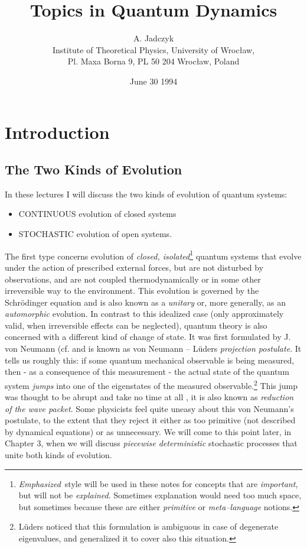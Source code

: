 \documentclass[12pt]{article}
\title{Topics in Quantum Dynamics}
\author{A.  Jadczyk \\
Institute of Theoretical Physics, 
 University of Wroc{\l }aw,  \\
Pl.  Maxa Borna 9,  PL 50 204 Wroc{\l }aw,  Poland} %
\date{June 30 1994}
\begin{document}
\newtheorem{theorem}{Theorem}
\maketitle
\section{Introduction}
\subsection{The Two Kinds of Evolution}
In these lectures I will discuss the two kinds of evolution of
quantum systems:  \begin{itemize}
\item CONTINUOUS evolution of closed systems
\item STOCHASTIC evolution of open systems.  
\end{itemize}
The first type
concerns evolution of {\em closed, 
isolated}\footnote{
{\em Emphasized}\,  style will be  used in these notes
for  concepts that are {\em
important},  but will not be {\em explained}.  Sometimes explanation
would need too much space,  but sometimes because these are either {\em
primitive} or {\em meta--language} notions. } quantum systems that evolve
under the action of prescribed external forces,  but are not disturbed by
observations,  and are not coupled thermodynamically or in some other
irreversible way to the environment.  This evolution is governed by the
Schr\"odinger equation and is also known as a {\em unitary} or,  more
generally,  as an {\em automorphic} evolution.  In contrast to this idealized
case  (only approximately valid, when irreversible effects can be neglected),
quantum theory is also concerned with a different kind of change of state. 
It was first formulated by J.  von Neumann  (cf.  \cite[Ch.  V. 1]{neu} and is
known as von Neumann -- L\"uders {\em projection postulate}.  It tells us
roughly this:  if some quantum mechanical observable is being measured,
then - as
a consequence of this measurement - the actual state of the quantum system 
{\em jumps} into one of the eigenstates of the measured
observable.\footnote{L\"uders
\cite{lud} noticed that this formulation is ambiguous in case of
degenerate eigenvalues,  and generalized it to cover also this
situation. } This jump was thought to be abrupt and take no time at all
,  it is also known as {\em
reduction of the wave packet}.  Some physicists feel quite uneasy about this
von Neumann's postulate,  to the extent that they reject it either as too
primitive  (not described by dynamical equations) or as unnecessary.  We will
come to this point later,  in Chapter 3,  when we will discuss {\em piecewise 
deterministic}
stochastic processes that unite both kinds of evolution. 
\end{document}
